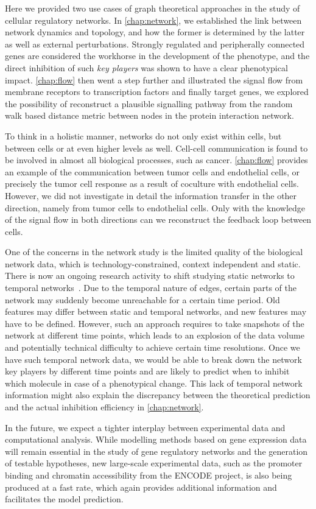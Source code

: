 Here we provided two use cases of graph theoretical approaches
in the study of cellular regulatory networks. 
In \ref{chap:network}, we established the link between network
dynamics and topology, and how the former is determined by
the latter as well as external perturbations. Strongly 
regulated and peripherally connected genes are considered 
the workhorse in the development of the phenotype, and the
direct inhibition of such \emph{key players} was shown to 
have a clear phenotypical impact. \ref{chap:flow} then
went a step further and illustrated the signal flow from
membrane receptors to transcription factors and finally 
target genes, we explored the possibility of reconstruct
a plausible signalling pathway from the random walk based
distance metric between nodes in the protein interaction
network.

To think in a holistic manner, networks do not only exist
within cells, but between cells or at even higher levels
as well. Cell-cell communication is found to be involved
in almost all biological processes, such as cancer. 
\ref{chap:flow} provides an example of the communication
between tumor cells and endothelial cells, or precisely
the tumor cell response as a result of coculture with 
endothelial cells. However, we did not investigate in detail 
the information
transfer in the other direction, namely from tumor cells
to endothelial cells. Only with the knowledge of the signal
flow in both directions can we reconstruct the feedback loop
between cells.

One of the concerns in the network study is the limited
quality of the biological network data, which is 
technology-constrained, context independent and static. 
There is now an ongoing research activity to shift studying
static networks to temporal networks~\citep{Holme2012}.
Due to the temporal nature of edges, certain parts of
the network may suddenly become unreachable for a certain
time period. Old features may differ between static and
temporal networks, and new features may have to be 
defined. However, such an approach requires to take 
snapshots of the network at different time points, which
leads to an explosion of the data volume and potentially
technical difficulty to achieve certain time resolutions.
Once we have such temporal network data, we would be
able to break down the network key players by different
time points and are likely to predict when to inhibit
which molecule in case of a phenotypical change. 
This lack of temporal network information might also
explain the discrepancy between the theoretical 
prediction and the actual inhibition efficiency in
\ref{chap:network}.

In the future, we expect a tighter interplay between 
experimental data and computational analysis. While
modelling methods based on gene expression 
data will remain essential 
in the study of gene regulatory networks and the 
generation of testable hypotheses, new large-scale 
experimental
data, such as the promoter binding and chromatin 
accessibility from the ENCODE project, is also being
produced at a fast rate, which again provides
additional information and facilitates the model
prediction.
